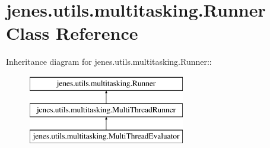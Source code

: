 \hypertarget{classjenes_1_1utils_1_1multitasking_1_1_runner}{
\section{jenes.utils.multitasking.Runner Class Reference}
\label{classjenes_1_1utils_1_1multitasking_1_1_runner}
}
Inheritance diagram for jenes.utils.multitasking.Runner::\begin{figure}[H]
\begin{center}
\leavevmode
\includegraphics[height=3cm]{classjenes_1_1utils_1_1multitasking_1_1_runner}
\end{center}
\end{figure}
